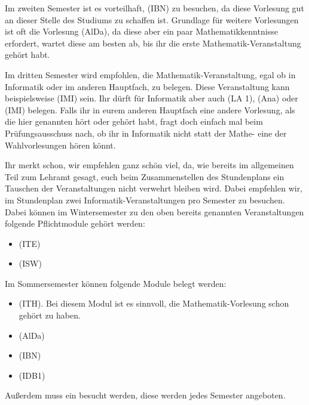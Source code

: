 Im zweiten Semester ist es vorteilhaft,  (\gls{IBN}) zu besuchen, da diese Vorlesung gut an dieser Stelle des Studiums zu schaffen ist. Grundlage für weitere Vorlesungen ist oft die Vorlesung  (\gls{AlDa}), da diese aber ein paar Mathematikkenntnisse erfordert, wartet diese am besten ab, bis ihr die erste Mathematik-Veranstaltung gehört habt.

Im dritten Semester wird empfohlen, die Mathematik-Veranstaltung, egal ob in Informatik oder im anderen Hauptfach, zu belegen. Diese Veranstaltung kann beispielsweise  (\gls{IMI}) sein. Ihr dürft für Informatik aber auch  (\gls{LA} 1),  (\gls{Ana}) oder  (\gls{IMI}) belegen. Falls ihr in eurem anderen Hauptfach eine andere Vorlesung, als die hier genannten hört oder gehört habt, fragt doch einfach mal beim Prüfungsausschuss nach, ob ihr in Informatik nicht statt der Mathe- eine der Wahlvorlesungen hören könnt.

Ihr merkt schon, wir empfehlen ganz schön viel, da, wie bereits im allgemeinen Teil zum Lehramt gesagt, euch beim Zusammenstellen des Stundenplans ein Tauschen der Veranstaltungen nicht verwehrt bleiben wird. Dabei empfehlen wir, im Stundenplan zwei Informatik-Veranstaltungen pro Semester zu besuchen. Dabei können im Wintersemester zu den oben bereits genannten Veranstaltungen folgende Pflichtmodule gehört werden:
\begin{itemize}
    \item {} (\gls{ITE})
    \item {} (\gls{ISW})
\end{itemize}
Im Sommersemester können folgende Module belegt werden:
\begin{itemize}
    \item {} (\gls{ITH}). Bei diesem Modul ist es sinnvoll, die Mathematik-Vorlesung schon gehört zu haben.
    \item {} (\gls{AlDa})
    \item {} (\gls{IBN})
    \item {} (\gls{IDB1})
\end{itemize}
Außerdem muss ein  besucht werden, diese werden jedes Semester angeboten.

